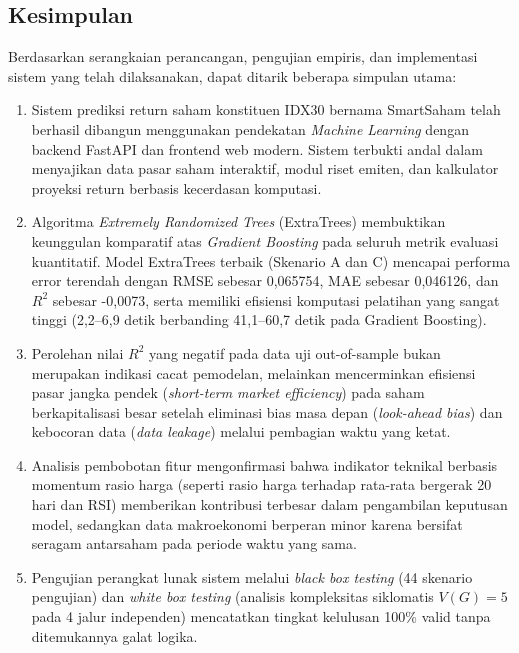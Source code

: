 \documentclass[10pt,a4paper]{article}
\begin{document}
\subsection{Kesimpulan}
Berdasarkan serangkaian perancangan, pengujian empiris, dan implementasi sistem yang telah dilaksanakan, dapat ditarik beberapa simpulan utama:
\begin{enumerate}
  \item Sistem prediksi return saham konstituen IDX30 bernama SmartSaham telah berhasil dibangun menggunakan pendekatan \textit{Machine Learning} dengan backend FastAPI dan frontend web modern. Sistem terbukti andal dalam menyajikan data pasar saham interaktif, modul riset emiten, dan kalkulator proyeksi return berbasis kecerdasan komputasi.
  \item Algoritma \textit{Extremely Randomized Trees} (ExtraTrees) membuktikan keunggulan komparatif atas \textit{Gradient Boosting} pada seluruh metrik evaluasi kuantitatif. Model ExtraTrees terbaik (Skenario A dan C) mencapai performa error terendah dengan RMSE sebesar 0,065754, MAE sebesar 0,046126, dan $R^2$ sebesar -0,0073, serta memiliki efisiensi komputasi pelatihan yang sangat tinggi (2,2--6,9 detik berbanding 41,1--60,7 detik pada Gradient Boosting).
  \item Perolehan nilai $R^2$ yang negatif pada data uji out-of-sample bukan merupakan indikasi cacat pemodelan, melainkan mencerminkan efisiensi pasar jangka pendek (\textit{short-term market efficiency}) pada saham berkapitalisasi besar setelah eliminasi bias masa depan (\textit{look-ahead bias}) dan kebocoran data (\textit{data leakage}) melalui pembagian waktu yang ketat.
  \item Analisis pembobotan fitur mengonfirmasi bahwa indikator teknikal berbasis momentum rasio harga (seperti rasio harga terhadap rata-rata bergerak 20 hari dan RSI) memberikan kontribusi terbesar dalam pengambilan keputusan model, sedangkan data makroekonomi berperan minor karena bersifat seragam antarsaham pada periode waktu yang sama.
  \item Pengujian perangkat lunak sistem melalui \textit{black box testing} (44 skenario pengujian) dan \textit{white box testing} (analisis kompleksitas siklomatis $V(G)=5$ pada 4 jalur independen) mencatatkan tingkat kelulusan 100\% valid tanpa ditemukannya galat logika.
\end{enumerate}
\end{document}
